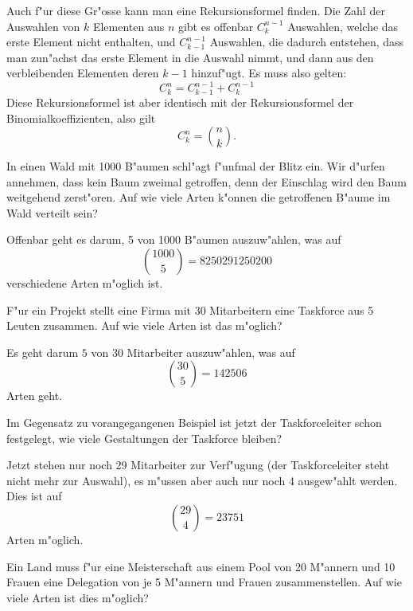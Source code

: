 Auch f"ur diese Gr"osse kann man eine Rekursionsformel finden.
Die Zahl der Auswahlen von $k$ Elementen aus $n$ gibt es
offenbar $C^{n-1}_{k}$ Auswahlen, welche das erste Element nicht
enthalten, und $C^{n-1}_{k-1}$ Auswahlen, die dadurch entstehen,
dass man zun"achst das erste Element in die Auswahl nimmt, und dann
aus den verbleibenden Elementen deren $k-1$ hinzuf"ugt.
Es muss also
gelten:
\[
C^n_k=C^{n-1}_{k-1}+C^{n-1}_{k}
\]
Diese Rekursionsformel ist aber identisch mit der Rekursionsformel
der Binomialkoeffizienten, also gilt
\[
C^n_k=\binom{n}{k}.
\]

\begin{beispiele}
\item In einen Wald mit 1000 B"aumen schl"agt f"unfmal der Blitz ein.
Wir d"urfen annehmen, dass kein Baum zweimal getroffen, denn der
Einschlag wird den Baum weitgehend zerst"oren.
Auf wie viele Arten
k"onnen die getroffenen B"aume im Wald verteilt sein?

\begin{loesung}
Offenbar geht es darum, 5 von 1000 B"aumen auszuw"ahlen, was 
auf
\[
\binom{1000}{5}=8250291250200
\]
verschiedene Arten m"oglich ist.
\end{loesung}

\item F"ur ein Projekt stellt eine Firma mit 30 Mitarbeitern eine Taskforce
aus 5 Leuten zusammen.
Auf wie viele Arten ist das m"oglich?


\begin{loesung}
Es geht darum $5$ von $30$ Mitarbeiter auszuw"ahlen, was auf
\[
\binom{30}{5}=142506
\]
Arten geht.
\end{loesung}

\item Im Gegensatz zu vorangegangenen Beispiel ist jetzt der
Taskforceleiter schon festgelegt, wie viele Gestaltungen der
Taskforce bleiben?

\begin{loesung}
Jetzt stehen nur noch 29 Mitarbeiter zur Verf"ugung (der Taskforceleiter
steht nicht mehr zur Auswahl), es m"ussen aber auch nur noch 4 ausgew"ahlt
werden.
Dies ist auf
\[
\binom{29}{4}=23751
\]
Arten m"oglich.
\end{loesung}

\item\label{meisterschaft}
Ein Land muss f"ur eine Meisterschaft aus einem Pool von
20 M"annern und 10 Frauen eine Delegation von je 5 M"annern
und Frauen zusammenstellen.
Auf wie viele Arten ist dies m"oglich?


\end{beispiele}
